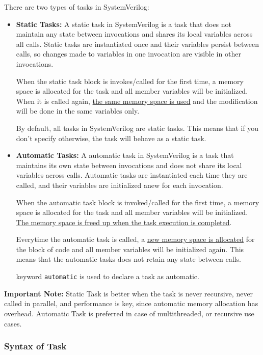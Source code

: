 \documentclass[12pt, a4paper]{article}
\begin{document}
There are two types of tasks in SystemVerilog:
\begin{itemize}
    \item \textbf{Static Tasks:}
A static task in SystemVerilog is a task that does not maintain any state between invocations and shares its local variables across all calls. Static tasks are instantiated
once and their variables persist between calls, so changes made to variables in one invocation are visible in other invocations.

When the static task block is invokes/called for the first time, a memory space is allocated for the task and all member variables will be initialized. When it is called again, \ul{the same memory space is used} and the modification will be done in the same variables only.

By default, all tasks in SystemVerilog are static tasks. This means that if you don't specify otherwise, the task will behave as a static task.

\vspace{0.5em}
    \item \textbf{Automatic Tasks:}
A automatic task in SystemVerilog is a task that maintains its own state between invocations and does not share its local variables across calls. Automatic tasks are instantiated each time they are called, and their variables are initialized anew for each invocation.

When the automatic task block is invoked/called for the first time, a memory space is allocated for the task and all member variables will be initialized. \ul{The memory space is freed up when the task execution is completed}.

Everytime the automatic task is called, a \ul{new memory space is allocated} for the block of code and all member variables will be initialized again. This means that the automatic tasks does not retain any state between calls.

keyword \texttt{automatic} is used to declare a task as automatic.
\end{itemize}

\textbf{Important Note:} Static Task is better when the task is never recursive, never called in parallel, and performance is key, since automatic memory allocation has overhead. 
Automatic Task is preferred in case of multithreaded, or recursive use cases.

\subsubsection{Syntax of Task}
\end{document}
